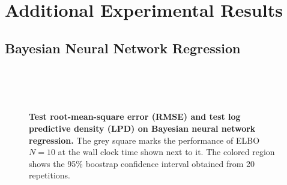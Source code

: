 
\section{Additional Experimental Results}
\subsection{Bayesian Neural Network Regression}\label{section:bnn_additional}

\begin{figure}[H]
  \centering
  \vspace{0.05in}\\
  \vspace{0.05in}\\
  \vspace{0.05in}\\
  \caption{\textbf{Test root-mean-square error (RMSE) and test log predictive density (LPD) on Bayesian neural network regression.} 
    The grey square marks the performance of ELBO \(N=10\) at the wall clock time shown next to it.
  The colored region shows the 95\% boostrap confidence interval obtained from 20 repetitions.}
\end{figure}

